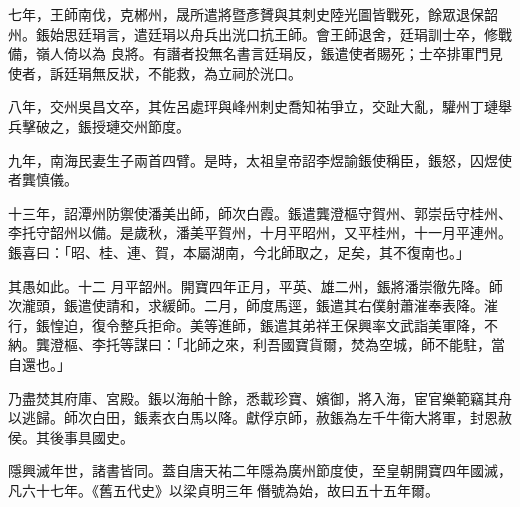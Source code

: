 \begin{pinyinscope}
 七年，王師南伐，克郴州，晟所遣將暨彥贇與其刺史陸光圖皆戰死，餘眾退保韶州。鋹始思廷琄言，遣廷琄以舟兵出洸口抗王師。會王師退舍，廷琄訓士卒，修戰備，嶺人倚以為
 良將。有譖者投無名書言廷琄反，鋹遣使者賜死；士卒排軍門見使者，訴廷琄無反狀，不能救，為立祠於洸口。



 八年，交州吳昌文卒，其佐呂處玶與峰州刺史喬知祐爭立，交趾大亂，驩州丁璉舉兵擊破之，鋹授璉交州節度。



 九年，南海民妻生子兩首四臂。是時，太祖皇帝詔李煜諭鋹使稱臣，鋹怒，囚煜使者龔慎儀。



 十三年，詔潭州防禦使潘美出師，師次白霞。鋹遣龔澄樞守賀州、郭崇岳守桂州、李托守韶州以備。是歲秋，潘美平賀州，十月平昭州，又平桂州，十一月平連州。鋹喜曰：「昭、桂、連、賀，本屬湖南，今北師取之，足矣，其不復南也。」



 其愚如此。十二
 月平韶州。開寶四年正月，平英、雄二州，鋹將潘崇徹先降。師次瀧頭，鋹遣使請和，求緩師。二月，師度馬逕，鋹遣其右僕射蕭漼奉表降。漼行，鋹惶迫，復令整兵拒命。美等進師，鋹遣其弟祥王保興率文武詣美軍降，不納。龔澄樞、李托等謀曰：「北師之來，利吾國寶貨爾，焚為空城，師不能駐，當自還也。」



 乃盡焚其府庫、宮殿。鋹以海舶十餘，悉載珍寶、嬪御，將入海，宦官樂範竊其舟以逃歸。師次白田，鋹素衣白馬以降。獻俘京師，赦鋹為左千牛衛大將軍，封恩赦侯。其後事具國史。



 隱興滅年世，諸書皆同。蓋自唐天祐二年隱為廣州節度使，至皇朝開寶四年國滅，凡六十七年。《舊五代史》以梁貞明三年僭號為始，故曰五十五年爾。



\end{pinyinscope}